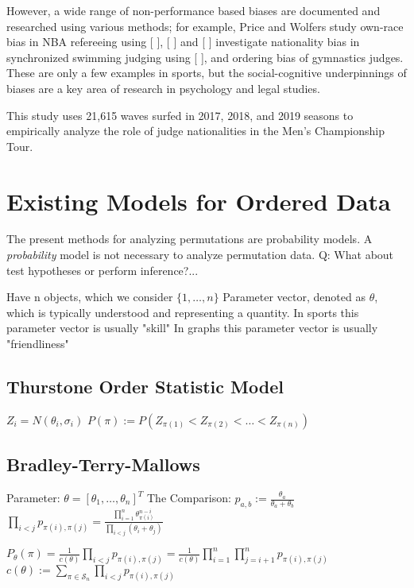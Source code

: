 \documentclass{article}
\theoremstyle{definition}
\begin{document}
However, a wide range of non-performance based biases are documented and researched using various methods; for example, Price and Wolfers study own-race bias in NBA refereeing using [        ], [   ] and [  ] investigate nationality bias in synchronized swimming judging using [       ], and ordering bias of gymnastics judges. These are only a few examples in sports, but the social-cognitive underpinnings of biases are a key area of research in psychology and legal studies.

This study uses 21,615 waves surfed in 2017, 2018, and 2019 seasons to empirically analyze the role of judge nationalities in the Men's Championship Tour.

\section{Existing Models for Ordered Data}
The present methods for analyzing permutations are probability models. A \textit{probability} model is not necessary to analyze permutation data.
Q: What about test hypotheses or perform inference?...


Have n objects, which we consider $ \{1,\dots,n\}$
Parameter vector, denoted as $\theta$, which is typically understood and representing a quantity. 
In sports this parameter vector is usually "skill"
In graphs this parameter vector is usually "friendliness"

\subsection{Thurstone Order Statistic Model}
$ Z_i = N(\theta_i, \sigma_i) $
\( P(\pi) := P(Z_{\pi(1)} < Z_{\pi(2)} < \dots < Z_{\pi(n)} ) \)

\subsection{Bradley-Terry-Mallows}
Parameter: \(\theta = [\theta_1, \dots, \theta_n]^T\)
The Comparison: \( p_{a,b} := \frac{\theta_a}{\theta_a + \theta_b} \)
\( 
\prod_{i<j} p_{\pi(i),\pi(j)} = \frac{ \prod_{i=1}^n \theta_{\pi(i)}^{n-i} }{ \prod_{i<j}(\theta_i + \theta_j) }
\)

\(
P_\theta(\pi) = \frac{1}{ c(\theta) } \prod_{i<j}p_{\pi(i),\pi(j)} 
= \frac{1}{c(\theta)} \prod_{i=1}^n \prod_{j=i+1}^n p_{\pi(i),\pi(j)}
\)
\(c(\theta) := \sum_{\pi \in \mathcal{S}_n} \prod_{i<j} p_{\pi(i),\pi(j)}
\)
\end{document}
